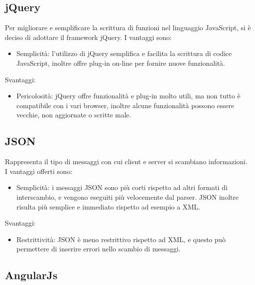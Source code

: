 \subsection{jQuery}
Per migliorare e semplificare la scrittura di funzioni nel linguaggio JavaScript, si è deciso di adottare il framework jQuery. I vantaggi sono:
\begin{itemize}
\item Semplicità: l'utilizzo di jQuery semplifica e facilita la scrittura di codice JavaScript, inoltre offre plug-in on-line per fornire nuove funzionalità.
\end{itemize}
Svantaggi:
\begin{itemize}
\item Pericolosità: jQuery offre funzionalità e plug-in molto utili, ma non tutto è compatibile con i vari browser, inoltre alcune funzionalità possono essere vecchie, non aggiornate o scritte male.
\end{itemize}

\subsection{JSON}
Rappresenta il tipo di messaggi con cui client e server si scambiano informazioni. I vantaggi offerti sono:
\begin{itemize}
\item Semplicità: i messaggi JSON sono più corti rispetto ad altri formati di interscambio, e vengono eseguiti più velocemente dal parser. JSON inoltre risulta più semplice e immediato rispetto ad esempio a XML.
\end{itemize}
Svantaggi:
\begin{itemize}
\item Restrittività: JSON è meno restrittivo rispetto ad XML, e questo può permettere di inserire errori nello scambio di messaggi.
\end{itemize}

\subsection{AngularJs}

